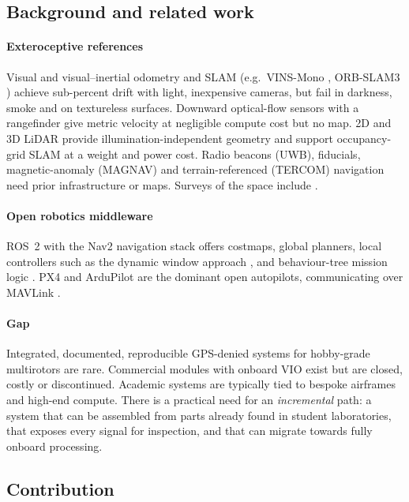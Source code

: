 \subsection{Background and related work}

\paragraph{Exteroceptive references} Visual and visual--inertial odometry and SLAM
(e.g.\ VINS-Mono \cite{qin2018vins}, ORB-SLAM3 \cite{campos2021orbslam3}) achieve
sub-percent drift with light, inexpensive cameras, but fail in darkness, smoke and on
textureless surfaces. Downward optical-flow sensors with a rangefinder
\cite{honegger2013px4flow} give metric velocity at negligible compute cost but no map.
2D and 3D LiDAR provide illumination-independent geometry and support occupancy-grid
SLAM \cite{macenski2021slamtoolbox} at a weight and power cost. Radio beacons (UWB),
fiducials, magnetic-anomaly (MAGNAV) and terrain-referenced (TERCOM) navigation need
prior infrastructure or maps. Surveys of the space include \cite{balamurugan2016survey}.

\paragraph{Open robotics middleware} ROS~2 \cite{macenski2022ros2} with the Nav2
navigation stack \cite{macenski2020marathon} offers costmaps, global planners, local
controllers such as the dynamic window approach \cite{fox1997dwa}, and behaviour-tree
mission logic \cite{colledanchise2018bt}. PX4 \cite{meier2015px4} and ArduPilot
\cite{ardupilot} are the dominant open autopilots, communicating over MAVLink
\cite{koubaa2019mavlink}.

\paragraph{Gap} Integrated, documented, reproducible GPS-denied systems for hobby-grade
multirotors are rare. Commercial modules with onboard VIO exist but are closed, costly
or discontinued. Academic systems are typically tied to bespoke airframes and high-end
compute. There is a practical need for an \emph{incremental} path: a system that can be
assembled from parts already found in student laboratories, that exposes every signal
for inspection, and that can migrate towards fully onboard processing.

\subsection{Contribution}


